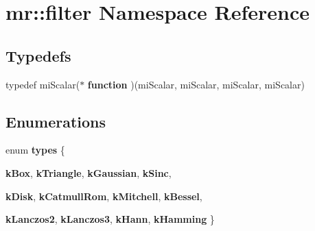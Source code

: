 \section{mr::filter Namespace Reference}
\label{namespacemr_1_1filter}


\subsection*{Typedefs}
\begin{CompactItemize}
\item 
typedef mi\-Scalar($\ast$ {\bf function} )(mi\-Scalar, mi\-Scalar, mi\-Scalar, mi\-Scalar)
\end{CompactItemize}
\subsection*{Enumerations}
\begin{CompactItemize}
\item 
enum {\bf types} \{ \par
{\bf k\-Box}, 
{\bf k\-Triangle}, 
{\bf k\-Gaussian}, 
{\bf k\-Sinc}, 
\par
{\bf k\-Disk}, 
{\bf k\-Catmull\-Rom}, 
{\bf k\-Mitchell}, 
{\bf k\-Bessel}, 
\par
{\bf k\-Lanczos2}, 
{\bf k\-Lanczos3}, 
{\bf k\-Hann}, 
{\bf k\-Hamming}
 \}
\end{CompactItemize}
